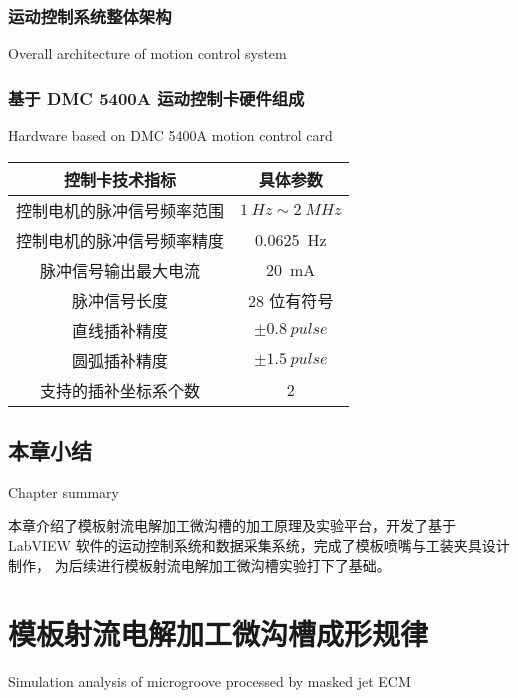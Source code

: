 \documentclass[
  type=doctor
]{../gdutthesis}
\begin{document}
\subsection{运动控制系统整体架构}{Overall architecture of motion control system}

\subsection{基于 DMC 5400A 运动控制卡硬件组成}{Hardware based on DMC 5400A motion control card}

\begin{table}[h]
  \label{tab:example}
  \begin{tabular}{cc}
    \toprule
    控制卡技术指标              & 具体参数                      \\
    \midrule
    控制电机的脉冲信号频率范围  & $\SI{1}{Hz}\sim\SI{2}{MHz}$   \\
    控制电机的脉冲信号频率精度  & \SI{0.0625}{Hz}               \\
    脉冲信号输出最大电流        & \SI{20}{mA}                   \\
    脉冲信号长度                & 28 位有符号                   \\
    直线插补精度                & $\pm \SI{0.8}{pulse}$         \\
    圆弧插补精度                & $\pm \SI{1.5}{pulse}$         \\
    支持的插补坐标系个数        & 2                             \\
    \bottomrule
  \end{tabular}
\end{table}

\section{本章小结}{Chapter summary}

本章介绍了模板射流电解加工微沟槽的加工原理及实验平台，开发了基于
LabVIEW 软件的运动控制系统和数据采集系统，完成了模板喷嘴与工装夹具设计制作，
为后续进行模板射流电解加工微沟槽实验打下了基础。

\chapter{模板射流电解加工微沟槽成形规律}{Simulation analysis of microgroove processed by masked jet ECM}
\end{document}
